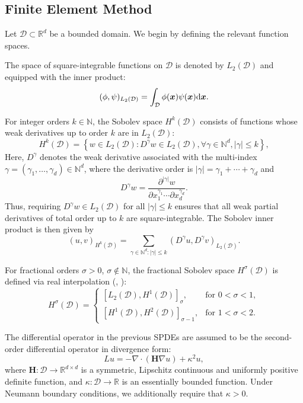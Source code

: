\documentclass[
  12pt]{article}
\newcommand{\citeay}[1]{\citeauthor{#1}, \citeyear{#1}}
\begin{document}
\subsection{Finite Element Method} \label{FEM}
Let $\mathcal{D} \subset \mathbb{R}^d$ be a bounded domain. We begin by defining the relevant function spaces.

The space of square-integrable functions on $\mathcal{D}$ is denoted by $L_2(\mathcal{D})$ and equipped with the inner product:
\[
(\phi,\psi)_{L_2(\mathcal{D})} = \int_{\mathcal{D}} \phi(\boldsymbol{x})\psi(\boldsymbol{x})\rm{d}\boldsymbol{x}.
\]

For integer orders $k \in \mathbb{N}$, the Sobolev space $H^k(\mathcal{D})$ consists of functions whose weak derivatives up to order $k$ are in $L_2(\mathcal{D})$:
\[
H^k(\mathcal{D}) = \left\{w \in L_2(\mathcal{D}) : D^{\gamma}w \in L_2(\mathcal{D}), \forall \gamma \in \mathbb{N}^d, |\gamma| \leq k\right\},
\]
Here, $D^{\gamma}$ denotes the weak derivative associated with the multi-index 
$\gamma = (\gamma_1,\dots,\gamma_d) \in \mathbb{N}^d$, where the derivative order is 
$|\gamma| = \gamma_1 + \cdots + \gamma_d$ and
\[
D^{\gamma} w = 
\frac{\partial^{|\gamma|} w}{\partial x_1^{\gamma_1}\cdots \partial x_d^{\gamma_d}}.
\]
Thus, requiring $D^{\gamma} w \in L_2(\mathcal{D})$ for all $|\gamma| \le k$ ensures that all weak partial derivatives of total order up to $k$ are square-integrable. 
The Sobolev inner product is then given by
\[
(u,v)_{H^k(\mathcal{D})} = \sum_{\gamma \in \mathbb{N}^d: |\gamma| \leq k} (D^{\gamma}u, D^{\gamma}v)_{L_2(\mathcal{D})}.
\]

For fractional orders $\sigma > 0$, $\sigma \notin \mathbb{N}$, the fractional Sobolev space $H^\sigma(\mathcal{D})$ is defined via real interpolation (\citeay{chandler2015interpolation}):
\[
H^{\sigma}(\mathcal{D}) = 
\begin{cases}
[L_2(\mathcal{D}), H^1(\mathcal{D})]_{\sigma}, & \text{for } 0 < \sigma < 1, \\
[H^1(\mathcal{D}), H^2(\mathcal{D})]_{\sigma-1}, & \text{for } 1 < \sigma < 2.
\end{cases}
\]

The differential operator in the previous SPDEs are assumed to be the second-order differential operator in divergence form:
\[
Lu = -\nabla \cdot (\boldsymbol{H}\nabla u) + \kappa^2 u,
\]
where $\boldsymbol{H}:\mathcal{D}\rightarrow\mathbb{R}^{d\times d}$ is a symmetric, Lipschitz continuous and uniformly positive definite function, and $\kappa:\mathcal{D}\rightarrow\mathbb{R}$ is an essentially bounded function. Under Neumann boundary conditions, we additionally require that $\kappa > 0$.
\end{document}
